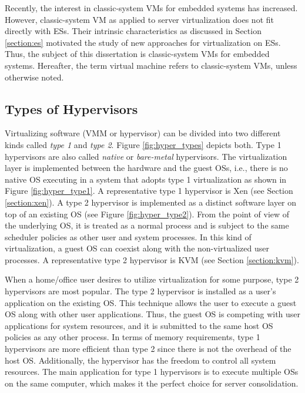Recently, the interest in classic-system VMs for embedded systems has increased. However, classic-system VM as applied to server virtualization does not fit directly with ESs. Their intrinsic characteristics as discussed in Section \ref{section:es} motivated the study of new approaches for virtualization on ESs. Thus, the subject of this dissertation is classic-system VMs for embedded systems. Hereafter, the term virtual machine refers to classic-system VMs, unless otherwise noted. 


\subsection{Types of Hypervisors}
\label{subsection:hypertypes}

Virtualizing software (VMM or hypervisor) can be divided into two different kinds called \emph{type 1} and \emph{type 2}. Figure \ref{fig:hyper_types} depicts both. Type 1 hypervisors are also called \emph{native} or \emph{bare-metal} hypervisors. The virtualization layer is implemented between the hardware and the guest OSs, i.e., there is no native OS executing in a system that adopts type 1 virtualization as shown in Figure \ref{fig:hyper_type1}. A representative type 1 hypervisor is Xen (see Section \ref{section:xen}). A type 2 hypervisor is implemented as a distinct software layer on top of an existing OS  (see Figure \ref{fig:hyper_type2}). From the point of view of the underlying OS, it is treated as a normal process and is subject to the same scheduler policies as other user and system processes. In this kind of virtualization, a guest OS can coexist along with the non-virtualized user processes. A representative type 2 hypervisor is KVM (see Section \ref{section:kvm}).

When a home/office user desires to utilize virtualization for some purpose, type 2 hypervisors are most popular. The type 2 hypervisor is installed as a user's application on the existing OS. This technique allows the user to execute a guest OS along with other user applications. Thus, the guest OS is competing with user applications for system resources, and it is submitted to the same host OS policies as any other process. In terms of memory requirements, type 1 hypervisors are more efficient than type 2 since there is not the overhead of the host OS. Additionally, the hypervisor has the freedom to control all system resources. The main application for type 1 hypervisors is to execute multiple OSs on the same computer, which makes it the perfect choice for server consolidation. 


